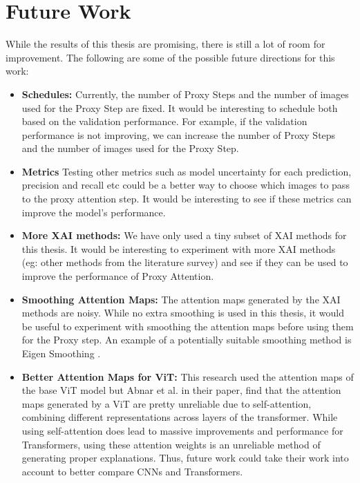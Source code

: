 \documentclass[a4paper,11pt,openright]{book}
\begin{document}
\section{Future Work}
While the results of this thesis are promising, there is still a lot of room for improvement. The following are some of the possible future directions for this work:
\begin{itemize}
    \item \textbf{Schedules:} Currently, the number of Proxy Steps and the number of images used for the Proxy Step are fixed. It would be interesting to schedule both based on the validation performance. For example, if the validation performance is not improving, we can increase the number of Proxy Steps and the number of images used for the Proxy Step.
    \item \textbf{Metrics} Testing other metrics such as model uncertainty for each prediction, precision and recall etc could be a better way to choose which images to pass to the proxy attention step. It would be interesting to see if these metrics can improve the model's performance.
    \item \textbf{More XAI methods:} We have only used a tiny subset of XAI methods for this thesis. It would be interesting to experiment with more XAI methods (eg: other methods from the literature survey) and see if they can be used to improve the performance of Proxy Attention.
    \item \textbf{Smoothing Attention Maps:} The attention maps generated by the XAI methods are noisy. While no extra smoothing is used in this thesis, it would be useful to experiment with smoothing the attention maps before using them for the Proxy step. An example of a potentially suitable smoothing method is Eigen Smoothing \cite{jacobPyTorchLibraryCAM2021}.
    \item \textbf{Better Attention Maps for ViT:} This research used the attention maps of the base ViT model but Abnar et al. \cite{abnarQuantifyingAttentionFlow2020} in their paper, find that the attention maps generated by a ViT are pretty unreliable due to self-attention, combining different representations across layers of the transformer. While using self-attention does lead to massive improvements and performance for Transformers, using these attention weights is an unreliable method of generating proper explanations. Thus, future work could take their work into account to better compare CNNs and Transformers.
\end{itemize}
\end{document}
